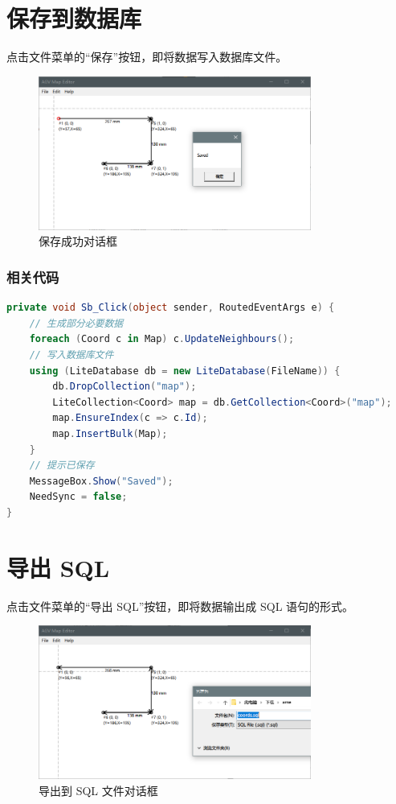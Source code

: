 \section{保存到数据库}

点击文件菜单的``保存''按钮，即将数据写入数据库文件。

\begin{figure}[H]
  \centering
  \includegraphics[width=0.8\textwidth]{assets/save.png}
  \caption{保存成功对话框}
  \label{fig:save}
\end{figure}

\subsubsection{相关代码}

\begin{lstlisting}[language=cs]
private void Sb_Click(object sender, RoutedEventArgs e) {
    // 生成部分必要数据
    foreach (Coord c in Map) c.UpdateNeighbours();
    // 写入数据库文件
    using (LiteDatabase db = new LiteDatabase(FileName)) {
        db.DropCollection("map");
        LiteCollection<Coord> map = db.GetCollection<Coord>("map");
        map.EnsureIndex(c => c.Id);
        map.InsertBulk(Map);
    }
    // 提示已保存
    MessageBox.Show("Saved");
    NeedSync = false;
}
\end{lstlisting}

\section{导出 SQL}

点击文件菜单的``导出 SQL''按钮，即将数据输出成 SQL 语句的形式。

\begin{figure}[H]
  \centering
  \includegraphics[width=0.8\textwidth]{assets/export.png}
  \caption{导出到 SQL 文件对话框}
  \label{fig:export}
\end{figure}

